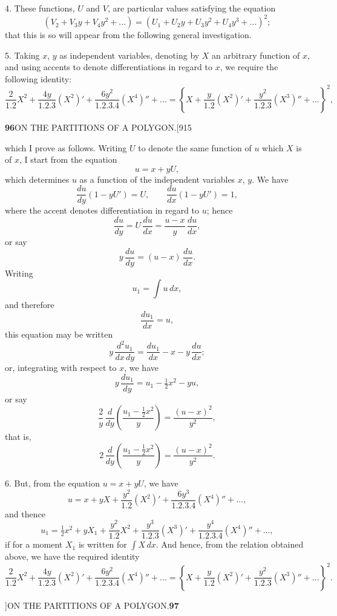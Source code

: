 \documentclass[11pt]{article}
\begin{document}
\hspace{1em} 4. These functions, $U$ and $V$, are particular values satisfying
the equation
\[
(V_{2}+V_{3}y+V_{4}y^{2}+\ldots)=(U_{1}+U_{2}y+U_{3}y^{2}+U_{4}y^{3}+\ldots)^{2};
\]
that this is so will appear from the following general investigation.

\hspace{1em} 5. Taking $x$, $y$ as independent variables, denoting by $X$ an
arbitrary function of $x$, and using accents to denote differentiations in
regard to $x$, we require the following identity:
\[
\frac{2}{1.2}X^{2}+\frac{4y}{1.2.3}(X^{2})'+\frac{6y^{2}}{1.2.3.4}(X^{4})''+\ldots
=\left\{X+\frac{y}{1.2}(X^{2})'+\frac{y^{2}}{1.2.3}(X^{3})''+\ldots\right\}^{2}\!,
\]

\newpage
\noindent\textbf{96}\hfill ON THE PARTITIONS OF A POLYGON.\hfill[915

\smallskip
which I prove as follows. Writing $U$ to denote the same function of $u$
which $X$ is of $x$, I start from the equation
\[
u=x+yU,
\]
which determines $u$ as a function of the independent variables $x$, $y$. We
have
\[
\frac{du}{dy}(1-yU')=U,\qquad \frac{du}{dx}(1-yU')=1,
\]
where the accent denotes differentiation in regard to $u$; hence
\[
\frac{du}{dy}=U\,\frac{du}{dx}=\frac{u-x}{y}\,\frac{du}{dx},
\]
or say
\[
y\,\frac{du}{dy}=(u-x)\,\frac{du}{dx}.
\]
Writing
\[
u_{1}=\int u\,dx,
\]
and therefore
\[
\frac{du_{1}}{dx}=u,
\]
this equation may be written
\[
y\,\frac{d^{2}u_{1}}{dx\,dy}=\frac{du_{1}}{dx}-x-y\,\frac{du}{dx};
\]
or, integrating with respect to $x$, we have
\[
y\,\frac{du_{1}}{dy}=u_{1}-\tfrac{1}{2}x^{2}-yu,
\]
or say
\[
\frac{2}{y}\,\frac{d}{dy}\!\left(\frac{u_{1}-\tfrac{1}{2}x^{2}}{y}\right)=\frac{(u-x)^{2}}{y^{2}},
\]
that is,
\[
2\,\frac{d}{dy}\!\left(\frac{u_{1}-\tfrac{1}{2}x^{2}}{y}\right)=\frac{(u-x)^{2}}{y^{2}}.
\]

\hspace{1em} 6. But, from the equation $u=x+yU$, we have
\[
u=x+yX+\frac{y^{2}}{1.2}(X^{2})'+\frac{6y^{3}}{1.2.3.4}(X^{4})''+\ldots,
\]
and thence
\[
u_{1}=\tfrac{1}{2}x^{2}+yX_{1}+\frac{y^{2}}{1.2}X^{2}+\frac{y^{3}}{1.2.3}(X^{3})'+\frac{y^{4}}{1.2.3.4}(X^{4})''+\ldots,
\]
if for a moment $X_{1}$ is written for $\int X\,dx$. And hence, from the
relation obtained above, we have the required identity
\[
\frac{2}{1.2}X^{2}+\frac{4y}{1.2.3}(X^{2})'+\frac{6y^{2}}{1.2.3.4}(X^{4})''+\ldots
=\left\{X+\frac{y}{1.2}(X^{2})'+\frac{y^{2}}{1.2.3}(X^{3})''+\ldots\right\}^{2}\!.
\]

\newpage
{}]\hfill ON THE PARTITIONS OF A POLYGON.\hfill\textbf{97}
\end{document}
